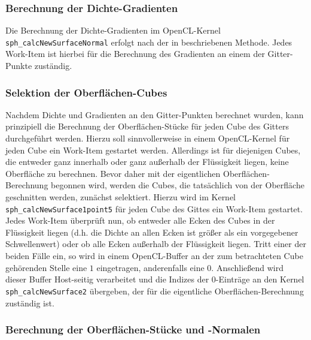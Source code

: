 \subsubsection*{Berechnung der Dichte-Gradienten}
Die Berechnung der Dichte-Gradienten im OpenCL-Kernel {\tt sph\_calcNewSurfaceNormal} erfolgt nach der in \cite[S. 165]{MC} beschriebenen Methode. Jedes Work-Item ist hierbei für die Berechnung des Gradienten an einem der Gitter-Punkte zuständig.
\medskip

\subsubsection*{Selektion der Oberflächen-Cubes}
Nachdem Dichte und Gradienten an den Gitter-Punkten berechnet wurden, kann prinzipiell die Berechnung der Oberflächen-Stücke für jeden Cube des Gitters durchgeführt werden. Hierzu soll sinnvollerweise in einem OpenCL-Kernel für jeden Cube ein Work-Item gestartet werden. Allerdings ist für diejenigen Cubes, die entweder ganz innerhalb oder ganz außerhalb der Flüssigkeit liegen, keine Oberfläche zu berechnen. Bevor daher mit der eigentlichen Oberflächen-Berechnung begonnen wird, werden die Cubes, die tatsächlich von der Oberfläche geschnitten werden, zunächst selektiert. Hierzu wird im Kernel {\tt sph\_calcNewSurface1point5} für jeden Cube des Gittes ein Work-Item gestartet. Jedes Work-Item überprüft nun, ob entweder alle Ecken des Cubes in der Flüssigkeit liegen (d.h. die Dichte an allen Ecken ist größer als ein vorgegebener Schwellenwert) oder ob alle Ecken außerhalb der Flüssigkeit liegen. Tritt einer der beiden Fälle ein, so wird in einem OpenCL-Buffer an der zum betrachteten Cube gehörenden Stelle eine $1$ eingetragen, anderenfalls eine $0$. Anschließend wird dieser Buffer Host-seitig verarbeitet und die Indizes der $0$-Einträge an den Kernel {\tt sph\_calcNewSurface2} übergeben, der für die eigentliche Oberflächen-Berechnung zuständig ist.
\medskip

\subsubsection*{Berechnung der Oberflächen-Stücke und -Normalen}





